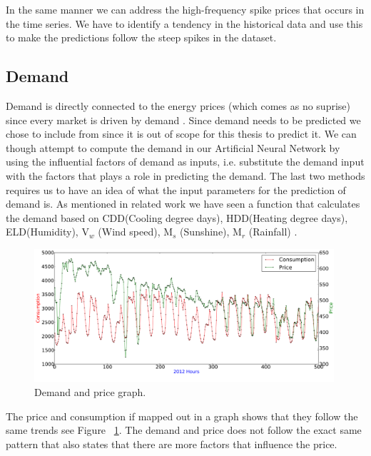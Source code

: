 In the same manner we can address the high-frequency spike prices that occurs in the time series. We have to identify a tendency in the historical data and use this to make the predictions follow the steep spikes in the dataset.

\subsection{Demand}
Demand is directly connected to the energy prices (which comes as no suprise) since every market is driven by demand \cite{singhal2011electricity}. Since demand needs to be predicted we chose to include from  since it is out of scope for this thesis to predict it. We can though attempt to compute the demand in our Artificial Neural Network by using the influential factors of demand as inputs, i.e. substitute the demand input with the factors that plays a role in predicting the demand. The last two methods requires us to have an idea of what the input parameters for the prediction of demand is. As mentioned in related work we have seen a function that calculates the demand based on CDD(Cooling degree days), HDD(Heating degree days), ELD(Humidity), V$_w$ (Wind speed), M$_s$ (Sunshine), M$_r$ (Rainfall) \cite{19}.

\begin{figure}[H]
\centering
\includegraphics[width=0.99\textwidth ]{billeder/energy_price_plots/price_consump_graph.png}
\caption{Demand and price graph.}
\label{fig:consump_price_graph}
\end{figure}

The price and consumption if mapped out in a graph shows that they follow the same trends see Figure ~\ref{fig:consump_price_graph}. The demand and price does not follow the exact same pattern that also states that there are more factors that influence the price.


